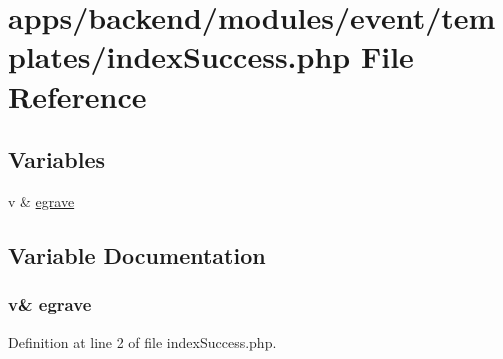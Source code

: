 \hypertarget{backend_2modules_2event_2templates_2index_success_8php}{\section{apps/backend/modules/event/templates/index\-Success.php File Reference}
\label{backend_2modules_2event_2templates_2index_success_8php}
}
\subsection*{Variables}
\begin{DoxyCompactItemize}
\item 
v \& \hyperlink{backend_2modules_2event_2templates_2index_success_8php_a0b6fe8b25452531819b6130e8e048b35}{egrave}
\end{DoxyCompactItemize}


\subsection{Variable Documentation}
\hypertarget{backend_2modules_2event_2templates_2index_success_8php_a0b6fe8b25452531819b6130e8e048b35}{
\subsubsection[{egrave}]{\setlength{\rightskip}{0pt plus 5cm}v\& egrave}}\label{backend_2modules_2event_2templates_2index_success_8php_a0b6fe8b25452531819b6130e8e048b35}


Definition at line 2 of file index\-Success.\-php.

